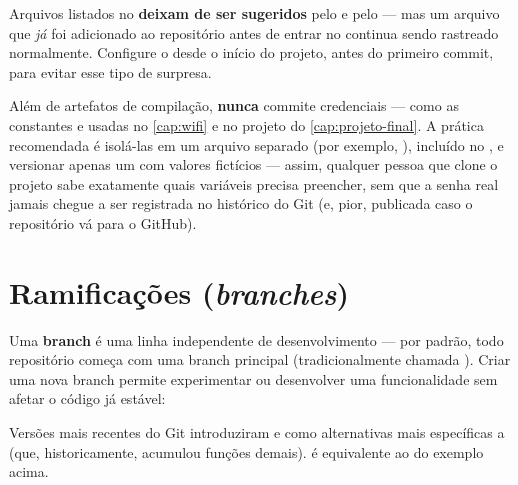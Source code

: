 \begin{atencao}
Arquivos listados no  \textbf{deixam de ser sugeridos} pelo  e pelo  — mas um arquivo que \emph{já} foi adicionado ao repositório antes de entrar no  continua sendo rastreado normalmente. Configure o  desde o início do projeto, antes do primeiro commit, para evitar esse tipo de surpresa.
\end{atencao}

\begin{esp32box}
Além de artefatos de compilação, \textbf{nunca} commite credenciais — como as constantes  e  usadas no \cref{cap:wifi} e no projeto do \cref{cap:projeto-final}. A prática recomendada é isolá-las em um arquivo separado (por exemplo, ), incluído no , e versionar apenas um  com valores fictícios — assim, qualquer pessoa que clone o projeto sabe exatamente quais variáveis precisa preencher, sem que a senha real jamais chegue a ser registrada no histórico do Git (e, pior, publicada caso o repositório vá para o GitHub).
\end{esp32box}

\section{Ramificações (\emph{branches})}

Uma \textbf{branch} é uma linha independente de desenvolvimento — por padrão, todo repositório começa com uma branch principal (tradicionalmente chamada ). Criar uma nova branch permite experimentar ou desenvolver uma funcionalidade sem afetar o código já estável:


\begin{nota}
Versões mais recentes do Git introduziram  e  como alternativas mais específicas a  (que, historicamente, acumulou funções demais).  é equivalente ao  do exemplo acima.
\end{nota}

